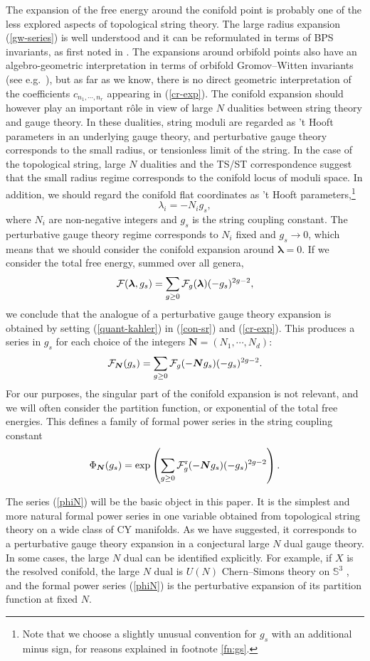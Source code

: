 \documentclass[a4paper,11pt]{article}
\theoremstyle{definition}
\newcommand{\CF}{{\cal F}}
\def\IS{{\mathbb S}}
\def\blambda{\boldsymbol{\lambda}}
\def\bN{{\boldsymbol{N}}}
\newcommand{\be}{\begin{equation}}
\newcommand{\ee}{\end{equation}}
\begin{document}
 The expansion of the free energy around the conifold point is
 probably one of the less explored aspects of topological string
 theory. The large radius expansion (\ref{gw-series}) is well
 understood and it can be reformulated in terms of BPS invariants, as
 first noted in \cite{gv}. The expansions around orbifold points also
 have an algebro-geometric interpretation in terms of orbifold
 Gromov--Witten invariants (see e.g.~\cite{abk}), but as far as we
 know, there is no direct geometric interpretation of the coefficients
 $c_{n_1, \cdots, n_r}$ appearing in (\ref{cr-exp}).  The conifold
 expansion should however play an important r\^ole in view of large
 $N$ dualities between string theory and gauge theory. In these
 dualities, string moduli are regarded as 't Hooft parameters in an
 underlying gauge theory, and perturbative gauge theory corresponds to
 the small radius, or tensionless limit of the string. In the case of
 the topological string, large $N$ dualities and the TS/ST
 correspondence suggest that the small radius regime corresponds to
 the conifold locus of moduli space.  In addition, we should regard
 the conifold flat coordinates as 't Hooft parameters,\footnote{Note
   that we choose a slightly unusual convention for $g_s$ with an
   additional minus sign, for reasons explained in footnote
   \ref{fn:gs}.}
%
\be
\label{quant-kahler}
\lambda_i = -N_i g_s, 
\ee
%
where $N_i$ are non-negative integers and $g_s$ is the string coupling
constant. The perturbative gauge theory regime corresponds to $N_i$
fixed and $g_s \rightarrow 0$, which means that we should consider the
conifold expansion around $\blambda=0$. If we consider the total free
energy, summed over all genera,
%
\be
\CF(\blambda, g_s)= \sum_{ g \ge 0} \CF_g(\blambda) (-g_s)^{2g-2},
\ee
%
we conclude that the analogue of a perturbative gauge theory expansion
is obtained by setting (\ref{quant-kahler}) in (\ref{con-sr}) and
(\ref{cr-exp}). This produces a series in $g_s$ for each choice of the
integers $\bN=(N_1, \cdots, N_d)$:
%
\be
\CF_{\bN} (g_s)=  \sum_{ g \ge 0} \CF_g(-\bN g_s) (-g_s)^{2g-2}.
\ee
%
For our purposes, the singular part of the conifold expansion is not
relevant, and we will often consider the partition function, or
exponential of the total free energies.  This defines a family of
formal power series in the string coupling constant
%
\be
\label{phiN}
\Phi_{\bN} (g_s)= \exp\left( \sum_{ g \ge 0} \CF^{\rm r}_g(-\bN g_s) (-g_s)^{2g-2} \right).
\ee
%

The series (\ref{phiN}) will be the basic object in this paper. It is
the simplest and more natural formal power series in one variable
obtained from topological string theory on a wide class of CY
manifolds. As we have suggested, it corresponds to a perturbative
gauge theory expansion in a conjectural large $N$ dual gauge theory.
In some cases, the large $N$ dual can be identified explicitly. For
example, if $X$ is the resolved conifold, the large $N$ dual is $U(N)$
Chern--Simons theory on $\IS^3$ \cite{gv-cs}, and the formal power series
(\ref{phiN}) is the perturbative expansion of its partition function
at fixed $N$.
\end{document}
